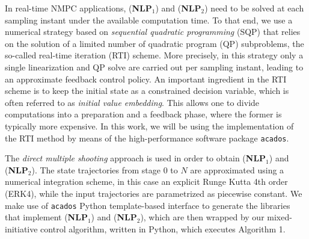 In real-time NMPC applications, (\textbf{NLP$_1$}) and (\textbf{NLP$_2$}) need to be solved at each sampling instant under the available computation time. To that end, we use a numerical strategy based on \emph{sequential quadratic programming} (SQP) that relies on the solution of a limited number of quadratic program (QP) subproblems, the so-called real-time iteration (RTI) scheme. More precisely, in this strategy only a single linearization and QP solve are carried out per sampling instant, leading to an approximate feedback control policy. An important ingredient in the RTI scheme is to keep the initial state as a constrained decision variable, which is often referred to as \emph{initial value embedding}. This allows one to divide computations into a preparation and a feedback phase, where the former is typically more expensive. In this work, we will be using the implementation of the RTI method by means of the high-performance software package \texttt{acados}.

The \emph{direct multiple shooting} approach is used in order to obtain (\textbf{NLP$_1$}) and (\textbf{NLP$_2$}). The state trajectories from stage 0 to $N$ are approximated using a numerical integration scheme, in this case an explicit Runge Kutta 4th order (ERK4), while the input trajectories are parametrized as piecewise constant. We make use of \texttt{acados} Python template-based interface to generate the libraries that implement (\textbf{NLP$_1$}) and (\textbf{NLP$_2$}), which are then wrapped by our mixed-initiative control algorithm, written in Python, which executes Algorithm 1. 

